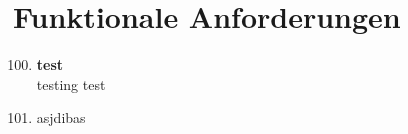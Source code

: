 \chapter{Funktionale Anforderungen}
\begin{enumerate}[label=\textbf{FA\arabic{enumi}0}]
	\setcounter{enumi}{99}
	\item \textbf{test}\\
		testing test
	\item asjdibas
\end{enumerate}
